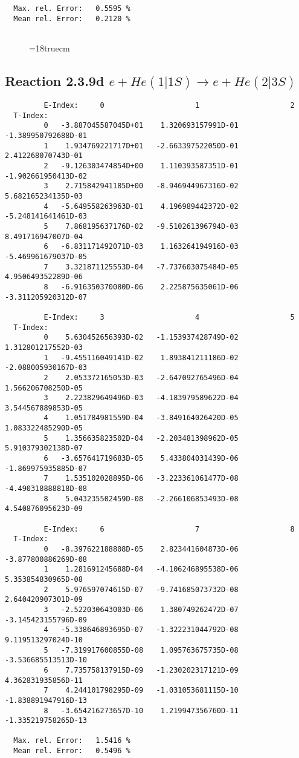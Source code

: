 \begin{verbatim}
  Max. rel. Error:   0.5595 %
  Mean rel. Error:   0.2120 %


\end{verbatim}
\begin{figure} \label{2.3.9c}
\epsfxsize=18truecm
\end{figure}
\newpage

\subsection{
Reaction 2.3.9d $ e + He(1|1S) \rightarrow e + He(2|3S) $
}




\begin{verbatim}
         E-Index:     0                     1                     2
  T-Index:
         0   -3.887045587045D+01    1.320693157991D-01   -1.389950792688D-01
         1    1.934769221717D+01   -2.663397522050D-01    2.412268070743D-01
         2   -9.126303474854D+00    1.110393587351D-01   -1.902661950413D-02
         3    2.715842941185D+00   -8.946944967316D-02    5.682165234135D-03
         4   -5.649558263963D-01    4.196989442372D-02   -5.248141641461D-03
         5    7.868195637176D-02   -9.510261396794D-03    8.491716947007D-04
         6   -6.831171492071D-03    1.163264194916D-03   -5.469961679037D-05
         7    3.321871125553D-04   -7.737603075484D-05    4.950649352289D-06
         8   -6.916350370080D-06    2.225875635061D-06   -3.311205920312D-07

         E-Index:     3                     4                     5
  T-Index:
         0    5.630452656393D-02   -1.153937428749D-02    1.312801217552D-03
         1   -9.455116049141D-02    1.893841211186D-02   -2.088005930167D-03
         2    2.053372165053D-03   -2.647092765496D-04    1.566206708250D-05
         3    2.223829649496D-03   -4.183979589622D-04    3.544567889853D-05
         4    1.051784981559D-04   -3.849164026420D-05    1.083322485290D-05
         5    1.356635823502D-04   -2.203481398962D-05    5.910379302138D-07
         6   -3.657641719683D-05    5.433804031439D-06   -1.869975935885D-07
         7    1.535102028895D-06   -3.223361061477D-08   -4.490318888818D-08
         8    5.043235502459D-08   -2.266106853493D-08    4.540876095623D-09

         E-Index:     6                     7                     8
  T-Index:
         0   -8.397622188808D-05    2.823441604873D-06   -3.877800886269D-08
         1    1.281691245688D-04   -4.106246895538D-06    5.353854830965D-08
         2    5.976597074615D-07   -9.741685073732D-08    2.640420907301D-09
         3   -2.522030643003D-06    1.380749262472D-07   -3.145423155796D-09
         4   -5.338646893695D-07   -1.322231044792D-08    9.119513297024D-10
         5   -7.319917600855D-08    1.095763675735D-08   -3.536685513513D-10
         6    7.735758137915D-09   -1.230202317121D-09    4.362831935856D-11
         7    4.244101798295D-09   -1.031053681115D-10   -1.838891947916D-13
         8   -3.654216273657D-10    1.219947356760D-11   -1.335219758265D-13

  Max. rel. Error:   1.5416 %
  Mean rel. Error:   0.5496 %


\end{verbatim}
